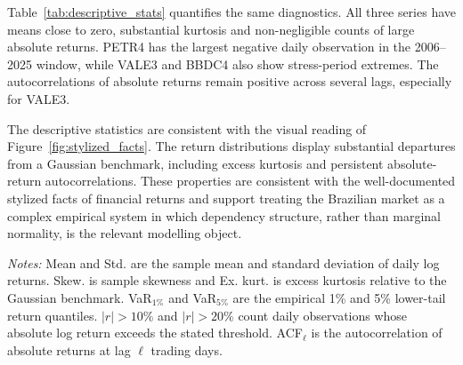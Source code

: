 Table~\ref{tab:descriptive_stats} quantifies the same diagnostics. All three series have means close to zero, substantial kurtosis and non-negligible counts of large absolute returns. PETR4 has the largest negative daily observation in the 2006--2025 window, while VALE3 and BBDC4 also show stress-period extremes. The autocorrelations of absolute returns remain positive across several lags, especially for VALE3.

The descriptive statistics are consistent with the visual reading of Figure~\ref{fig:stylized_facts}. The return distributions display substantial departures from a Gaussian benchmark, including excess kurtosis and persistent absolute-return autocorrelations. These properties are consistent with the well-documented stylized facts of financial returns \cite{cont_2001_empirical} and support treating the Brazilian market as a complex empirical system in which dependency structure, rather than marginal normality, is the relevant modelling object.

\begin{center}
\label{tab:descriptive_stats}
\scriptsize
\setlength{\tabcolsep}{2.8pt}
\end{center}

\noindent\footnotesize\emph{Notes:} Mean and Std. are the sample mean and standard deviation of daily log returns. Skew. is sample skewness and Ex. kurt. is excess kurtosis relative to the Gaussian benchmark. VaR$_{1\%}$ and VaR$_{5\%}$ are the empirical 1\% and 5\% lower-tail return quantiles. $|r|>10\%$ and $|r|>20\%$ count daily observations whose absolute log return exceeds the stated threshold. ACF$_\ell$ is the autocorrelation of absolute returns at lag $\ell$ trading days.

